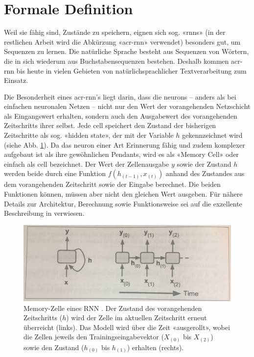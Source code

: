 \section{Formale Definition}
\label{sec:model-definition}

Weil sie fähig sind, Zustände zu speichern, eignen sich sog. «\glspl{rnn}» (in der restlichen Arbeit wird die Abkürzung «\acrshort{acr-rnn}» verwendet) besonders gut, um Sequenzen zu lernen.
Die natürliche Sprache besteht aus Sequenzen von Wörtern, die in sich wiederum aus Buchstabensequenzen bestehen.
Deshalb kommen \acrshort{acr-rnn} bis heute in vielen Gebieten von natürlichsprachlicher Textverarbeitung zum Einsatz.

Die Besonderheit eines \acrshort{acr-rnn}'s liegt darin, dass die \glspl{neuron} – anders als bei einfachen neuronalen Netzen – nicht nur den Wert der vorangehenden Netzschicht als
Eingangswert erhalten, sondern auch den Ausgabewert des vorangehenden Zeitschritts ihrer selbst.
Jede \gls{cell} speichert den Zustand der bisherigen Zeitschritte als sog. «hidden state», der mit der Variable $ h $ gekennzeichnet wird (siehe Abb. \ref{fig:rnn-model-definition-memory-cell}).
Da das \gls{neuron} einer Art Erinnerung fähig und zudem komplexer aufgebaut ist als ihre gewöhnlichen Pendants, wird es als «Memory Cell» oder einfach als \gls{cell} bezeichnet.
Der Wert der Zellenausgabe $ y $ sowie der Zustand $ h $ werden beide durch eine Funktion $ f(h_{(t-1)}, x_{(t)})$ anhand des Zustandes aus dem vorangehenden Zeitschritt sowie der Eingabe berechnet.
Die beiden Funktionen können, müssen aber nicht den gleichen Wert ausgeben.
Für nähere Details zur Architektur, Berechnung sowie Funktionsweise sei auf die exzellente Beschreibung in \autocite{geron} verwiesen.

\begin{figure}
    \centering
    \includegraphics[width=0.75\linewidth]{images/model/model-rnn-definition.jpg}
    \caption[RNN Modell]{Memory-Zelle eines RNN \autocite{geron}. Der Zustand des vorangehenden Zeitschritts ($ h $) wird der Zelle im aktuellen Zeitschritt erneut überreicht (links).
    Das Modell wird über die Zeit «ausgerollt», wobei die Zellen jeweils den Trainingseingabevektor ($ X_{(0)} $ bis $ X_{(2)} $) sowie den Zustand ($ h_{(0)} $ bis $ h_{(1)} $) erhalten (rechts).}
    \label{fig:rnn-model-definition-memory-cell}
\end{figure}

